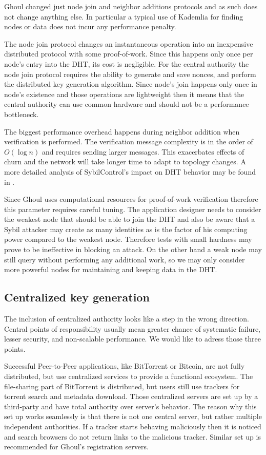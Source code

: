  Ghoul changed just node join and neighbor additions protocols and as
  such does not change anything else.
  In particular a typical use of Kademlia for finding nodes or data does not
  incur any performance penalty.

  The node join protocol changes an instantaneous operation into an inexpensive
  distributed protocol with some proof-of-work.
  Since this happens only once per node's entry into the DHT, its cost is
  negligible.
  For the central authority the node join protocol requires the ability to
  generate and save nonces, and perform the distributed key generation
  algorithm.
  Since node's join happens only once in node's existence and those operations
  are lightweight then it means that the central authority can use common
  hardware and should not be a performance bottleneck.

  The biggest performance overhead happens during neighbor addition when
  verification is performed. The verification message complexity is in the order
  of $O(\log n)$ and requires sending larger messages. This exacerbates effects
  of churn and the network will take longer time to adapt to topology changes.
  A more detailed analysis of SybilControl's impact on DHT behavior may be
  found in \cite{li12}.

  Since Ghoul uses computational resources for proof-of-work verification
  therefore this parameter requires careful tuning.
  The application designer needs to consider the weakest node that should be
  able to join the DHT and also be aware that a Sybil attacker may create as
  many identities as is the factor of his computing power compared to the
  weakest node.
  Therefore tests with small hardness may prove to be ineffective in blocking an
  attack.
  On the other hand a weak node may still query without performing any
  additional work, so we may only consider more powerful nodes for maintaining
  and keeping data in the DHT.

  \subsection{Centralized key generation}
  
  The inclusion of centralized authority looks like a step in the wrong
  direction. Central points of responsibility usually mean greater chance of
  systematic failure, lesser security, and non-scalable performance.
  We would like to adress those three points.

  Successful Peer-to-Peer applications, like BitTorrent or Bitcoin, are not
  fully distributed, but use centralized services to provide a functional
  ecosystem. The file-sharing part of BitTorrent is distributed, but users still
  use trackers for torrent search and metadata download.
  Those centralized servers are set up by a third-party and have total authority
  over server's behavior.
  The reason why this set up works seamlessly is that there is not one central
  server, but rather multiple independent authorities.
  If a tracker starts behaving maliciously then it is noticed and search
  browsers do not return links to the malicious tracker.
  Similar set up is recommended for Ghoul's registration servers.

